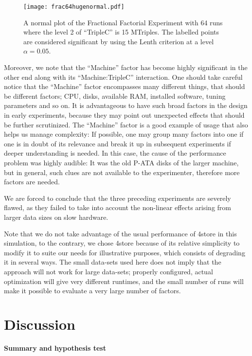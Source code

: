 \documentclass{llncs}
\begin{document}
\begin{figure}[h!]
  \texttt{[image: frac64hugenormal.pdf]}
  \caption{A normal plot of the Fractional Factorial Experiment with
    64 runs where the level 2 of ``TripleC'' is 15 MTriples. The
    labelled points are considered significant by using the Lenth
    criterion at a level $\alpha=0.05$.}\label{fig:frac64hugenormal}
\end{figure}


Moreover, we note that the ``Machine'' factor has become highly
significant in the other end along with its ``Machine:TripleC''
interaction. One should take careful notice that the ``Machine''
factor encompasses many different things, that should be different
factors; CPU, disks, available RAM, installed software, tuning
parameters and so on. It is advantageous to have such broad factors in
the design in early experiments, because they may point out unexpected
effects that should be further scrutinized. The ``Machine'' factor is
a good example of usage that also helps us manage complexity: If
possible, one may group many factors into one if one is in doubt of
its relevance and break it up in subsequent experiments if deeper
understanding is needed. In this case, the cause of the performance
problem was highly audible: It was the old P-ATA disks of the larger
machine, but in general, such clues are not available to the
experimenter, therefore more factors are needed.

We are forced to conclude that the three preceding experiments are
severely flawed, as they failed to take into account the non-linear
effects arising from larger data sizes on slow hardware. 


Note that we do not take advantage of the usual performance of 4store
in this simulation, to the contrary, we chose 4store because of its
relative simplicity to modify it to suite our needs for illustrative
purposes, which consists of degrading it in several ways. The small
data-sets used here does not imply that the approach will not work for
large data-sets; properly configured, actual optimization will give
very different runtimes, and the small number of runs will make it
possible to evaluate a very large number of factors.



\section{Discussion}

\paragraph{Summary and hypothesis test}
\end{document}
